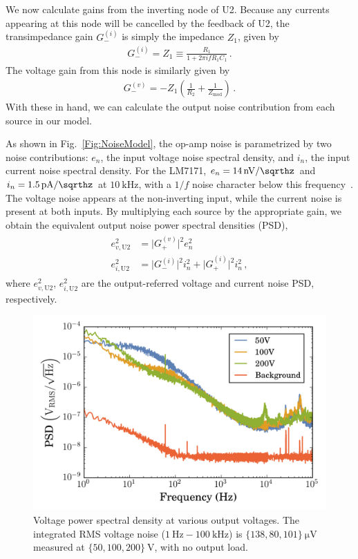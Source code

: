 \documentclass[aip,rsi,reprint]{revtex4-1} %
\begin{document}
We now calculate gains from the inverting node of U2.
Because any currents appearing at this node will be cancelled by the feedback of U2, the transimpedance gain $G_{-}^{(i)}$ is simply the impedance $Z_1$, given by
\begin{align}
G_{-}^{(i)} = Z_1 \equiv \frac{R_1}{1+2\pi i f R_1 C_1}\,.
\end{align}
The voltage gain from this node is similarly given by
\begin{align}
G_{-}^{(v)} = -Z_1 \left(\frac{1}{R_2} + \frac{1}{Z_\text{mod}}\right)\,.
\end{align}
With these in hand, we can calculate the output noise contribution from each source in our model.

As shown in Fig.~\ref{Fig:NoiseModel}, the op-amp noise is parametrized by two noise contributions: $e_n$, the input voltage noise spectral density, and $i_n$, the input current noise spectral density.
For the LM7171, $e_n = \SI[per-mode=symbol]{14}{\nano\volt\per\sqrthz}$ and $i_n = \SI[per-mode=symbol]{1.5}{\pico\ampere\per\sqrthz}$ at $\SI{10}{\kilo\hertz}$, with a $1/f$ noise character below this frequency~\cite{LM7171Datasheet}.
The voltage noise appears at the non-inverting input, while the current noise is present at both inputs.
By multiplying each source by the appropriate gain, we obtain the equivalent output noise power spectral densities (PSD),
\begin{align}
\begin{split}
e^2_{v,\text{U2}} &= \big|G_{+}^{(v)}\big|^2 e^2_n \\
e^2_{i,\text{U2}} &= \big|G_{-}^{(i)}\big|^2 i^2_n + \big|G_{+}^{(i)}\big|^2 i^2_n\,,
\end{split}
\end{align}
where  $e^2_{v,\text{U2}}$, $e^2_{i,\text{U2}}$ are the output-referred voltage and current noise PSD, respectively.

\begin{figure}[t]
\includegraphics[width=\columnwidth]{fig/VoltagePSD.png}
\caption{Voltage power spectral density at various output voltages. The integrated RMS voltage noise ($\SI{1}{\hertz} - \SI{100}{\kilo\hertz}$) is $\{138, 80, 101\}~\si{\micro\volt}$ measured at  $\{50, 100, 200\}~\si{\volt}$, with no output load. \label{Fig:PSD}}
\end{figure}
\end{document}
